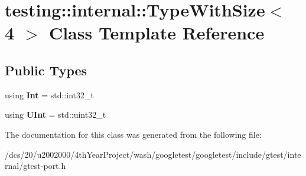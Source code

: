\hypertarget{classtesting_1_1internal_1_1TypeWithSize_3_014_01_4}{}\section{testing\+:\+:internal\+:\+:Type\+With\+Size$<$ 4 $>$ Class Template Reference}
\label{classtesting_1_1internal_1_1TypeWithSize_3_014_01_4}
\subsection*{Public Types}
\begin{DoxyCompactItemize}
\item 
\mbox{\label{classtesting_1_1internal_1_1TypeWithSize_3_014_01_4_a1d8c184b21efa24728441dd11476c82d}} 
using {\bfseries Int} = std\+::int32\+\_\+t
\item 
\mbox{\label{classtesting_1_1internal_1_1TypeWithSize_3_014_01_4_a101d382e484e36b2c5625ee5d23cba07}} 
using {\bfseries U\+Int} = std\+::uint32\+\_\+t
\end{DoxyCompactItemize}


The documentation for this class was generated from the following file\+:\begin{DoxyCompactItemize}
\item 
/dcs/20/u2002000/4th\+Year\+Project/wash/googletest/googletest/include/gtest/internal/gtest-\/port.\+h\end{DoxyCompactItemize}
